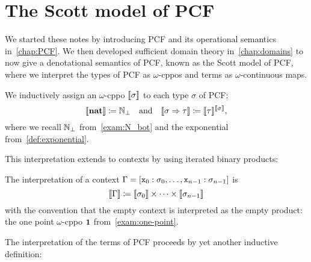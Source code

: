\chapter{The Scott model of PCF}

We started these notes by introducing PCF and its operational semantics
in~\cref{chap:PCF}. We then developed sufficient domain theory
in~\cref{chap:domains} to now give a denotational semantics of PCF, known as the
Scott model of PCF, where we interpret the types of PCF as \(\omega\)-cppos and
terms as \(\omega\)-continuous maps.

\begin{definition}
  We inductively assign an \(\omega\)-cppo \(\llbracket\sigma\rrbracket\) to each type
  \(\sigma\) of PCF:
  \[
    \llbracket\mathtt{\mathbf{nat}}\rrbracket \coloneqq \mathbb N_\bot
    \quad\text{and}\quad
    \llbracket\sigma \Rightarrow \tau\rrbracket \coloneqq \llbracket\tau\rrbracket^{\llbracket\sigma\rrbracket},
  \]
  where we recall \(\mathbb N_\bot\) from~\cref{exam:N_bot} and the exponential
  from~\cref{def:exponential}.
\end{definition}

This interpretation extends to contexts by using iterated binary products:
\begin{definition}
  The interpretation of a context
  \(\Gamma = [\mathtt x_0 : \sigma_0, \dots , \mathtt x_{n-1} :
  \sigma_{n-1}]\)
  is
  \[
    \llbracket\Gamma\rrbracket \coloneqq \llbracket\sigma_0\rrbracket \times \cdots \times
    \llbracket\sigma_{n-1}\rrbracket
  \]
  with the convention that the empty context is interpreted as the empty
  product: the one point \(\omega\)-cppo \(\mathbf 1\) from~\cref{exam:one-point}.
\end{definition}

The interpretation of the terms of PCF proceeds by yet another inductive
definition:

